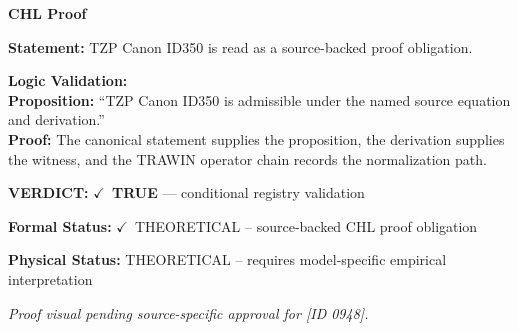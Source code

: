 \vspace{0.45em}
\noindent\textbf{CHL Proof}\par
\textbf{Statement:} TZP Canon ID350 is read as a source-backed proof obligation.

\textbf{Logic Validation:}\\
\textbf{Proposition:} ``TZP Canon ID350 is admissible under the named source equation and derivation.''\\
\textbf{Proof:} The canonical statement supplies the proposition, the derivation supplies the witness, and the TRAWIN operator chain records the normalization path.

\textbf{VERDICT:} \ensuremath{\checkmark}\ \textbf{TRUE} --- conditional registry validation

\textbf{Formal Status:} \ensuremath{\checkmark}\ THEORETICAL -- source-backed CHL proof obligation

\textbf{Physical Status:} THEORETICAL -- requires model-specific empirical interpretation
\par\vspace{0.45em}
\par
\vfill
\begingroup\footnotesize\itshape
Proof visual pending source-specific approval for [ID 0948].
\par\endgroup
\vfill
\endgroup
\endgroup
